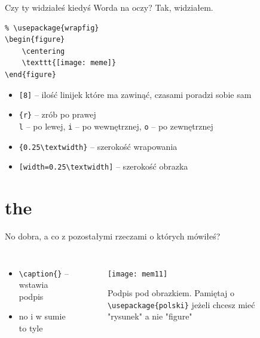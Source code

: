 \documentclass[handout]{beamer}
\newcommand{\tb}{\textbackslash}
\begin{document}
\begin{frame}[fragile]{Czy ty widziałeś kiedyś Worda na oczy?}{}
    Tak, widziałem.\pause

    \begin{verbatim}
% \usepackage{wrapfig}
\begin{figure}
    \centering
    \texttt{[image: meme]}
\end{figure}
    \end{verbatim}
    
    \begin{itemize}[<+->]
        \item{} \texttt{[8]} -- ilość linijek które ma zawinąć, czasami poradzi sobie sam
        \item \texttt{\{r\}} -- zrób po prawej\\
        \texttt{l} -- po lewej,
        \texttt{i} -- po wewnętrznej,
        \texttt{o} -- po zewnętrznej
        \item \texttt{\{0.25\tb{}textwidth\}} -- szerokość wrapowania
        \item \texttt{[width=0.25\tb{}textwidth]} -- szerokość obrazka
        
    \end{itemize}
    
    
\end{frame}

\section{the}

\begin{frame}{No dobra, a co z pozostałymi rzeczami o których mówiłeś?}{}
\begin{columns}
    \begin{itemize}[<+->]
        \item \texttt{\tb{caption\{\}}} -- wstawia podpis
        \item no i w sumie to tyle
    \end{itemize}
    
\begin{figure}
    \centering
    \texttt{[image: mem11]}
    \caption{Podpis pod obrazkiem. Pamiętaj o \texttt{\tb{}usepackage\{polski\}} jeżeli chcesz mieć "rysunek" a nie "figure"}
    \label{fig:my_label}
\end{figure}
\end{columns}
\end{frame}
\end{document}
